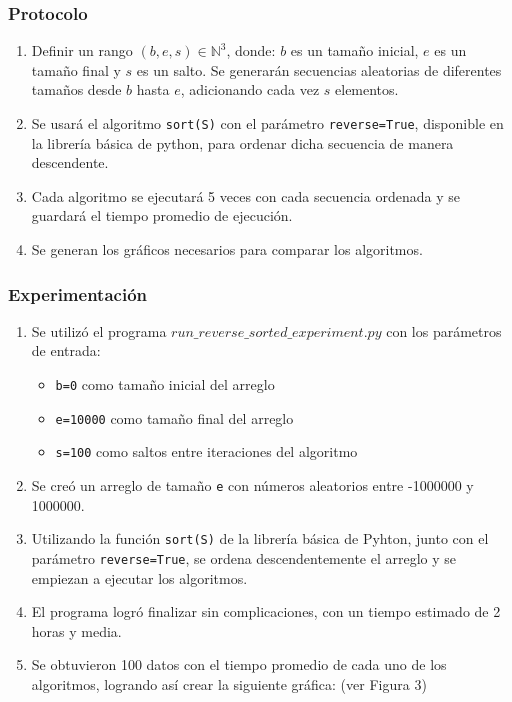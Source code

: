 \documentclass[letter]{article}
\begin{document}
\subsubsection{Protocolo}
\begin{enumerate}
    \item Definir un rango $(b,e,s)\in\mathbb{N}^3$, donde: $b$ es un tamaño inicial, $e$ es un tamaño final y $s$ es un salto. Se generarán secuencias aleatorias de diferentes tamaños desde $b$ hasta $e$, adicionando cada vez $s$ elementos.
    \item Se usará el algoritmo \texttt{sort(S)} con el parámetro \texttt{reverse=True}, disponible en la librería básica de python, para ordenar dicha secuencia de manera descendente.
    \item Cada algoritmo se ejecutará 5 veces con cada secuencia ordenada y se guardará el tiempo promedio de ejecución.
    \item Se generan los gráficos necesarios para comparar los algoritmos.
\end{enumerate}

\subsubsection{Experimentación}
\begin{enumerate}
    \item Se utilizó el programa \texttt{$run\_reverse\_sorted\_experiment.py$} con los parámetros de entrada:
    \begin{itemize}
        \item \texttt{b=0} como tamaño inicial del arreglo
        \item \texttt{e=10000} como tamaño final del arreglo
        \item \texttt{s=100} como saltos entre iteraciones del algoritmo
    \end{itemize}
    \item Se creó un arreglo de tamaño \texttt{e} con números aleatorios entre -1000000 y 1000000.
    \item Utilizando la función \texttt{sort(S)} de la librería básica de Pyhton, junto con el parámetro \texttt{reverse=True}, se ordena descendentemente el arreglo y se empiezan a ejecutar los algoritmos. 
    \item El programa logró finalizar sin complicaciones, con un tiempo estimado de 2 horas y media.
    \item Se obtuvieron 100 datos con el tiempo promedio de cada uno de los algoritmos, logrando así crear la siguiente gráfica: (ver Figura 3)
\end{enumerate}
\end{document}
